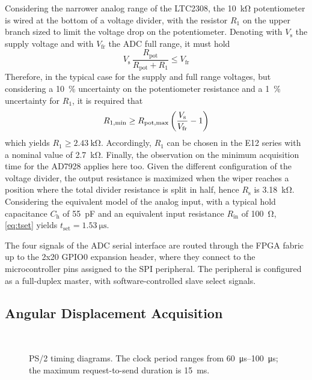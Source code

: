 \documentclass[]{article}
\begin{document}
Considering the narrower analog range of the LTC2308, the \qty{10}{\kohm} potentiometer is wired at the bottom of a voltage divider, with the resistor $R_1$ on the upper branch sized to limit the voltage drop on the potentiometer. Denoting with $V_\text{s}$ the supply voltage and with $V_\text{fr}$ the ADC full range, it must hold
\[
    V_\text{s}\,\frac{R_\text{pot}}{R_\text{pot} + R_1} \le V_\text{fr}
\]
Therefore, in the typical case for the supply and full range voltages, but considering a \qty{10}{\percent} uncertainty on the potentiometer resistance and a \qty{1}{\percent} uncertainty for $R_1$, it is required that
\[
    R_{1,\text{min}} \ge 
    R_{\text{pot},\text{max}}\,\pqty*{\frac{V_\text{s}}{V_\text{fr}}-1}
\]
which yields $R_1 \ge \qty{2.43}{\kohm}$. Accordingly, $R_1$ can be chosen in the E12 series with a nominal value of \qty{2.7}{\kohm}.
Finally, the observation on the minimum acquisition time for the AD7928 applies here too. Given the different configuration of the voltage divider, the output resistance is maximized when the wiper reaches a position where the total divider resistance is split in half, hence $R_\text{s}$ is \qty{3.18}{\kohm}. Considering the equivalent model of the analog input, with a typical hold capacitance $C_\text{h}$ of \qty{55}{\pF} and an equivalent input resistance $R_\text{in}$ of \qty{100}{\ohm}, \cref{eq:tset} yields $t_\text{set} = \qty{1.53}{\us}$.

The four signals of the ADC serial interface are routed through the FPGA fabric up to the 2x20 GPIO0 expansion header, where they connect to the microcontroller pins assigned to the SPI peripheral. The peripheral is configured as a full-duplex master, with software-controlled slave select signals.

\subsection{Angular Displacement Acquisition}\label{subsec:ps2}

\begin{figure}
    \centering
    \\
    \caption{PS/2 timing diagrams. The clock period ranges from \qtyrange{60}{100}{\micro\s}; the maximum request-to-send duration is \qty{15}{\milli\s}.}
    \label{fig:ps2_timing}
\end{figure}
\end{document}
